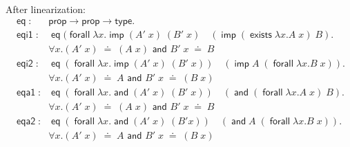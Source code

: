 \documentclass{acmconf}
\newcommand{\typeLF}{\textsf{type}}
\newcommand{\propLF}{\textsf{prop}}
\newcommand{\andLF}{\; \textsf{and}\;}
\newcommand{\impLF}{\;\textsf{imp}\;}
\newcommand{\forallLF}{\;\textsf{forall}\;}
\newcommand{\existsLF}{\;\textsf{exists}\;}
\newcommand{\eqLF}{\;\textsf{eq}\;}
\newcommand{\eqilLF}{\;\textsf{eqi1}\;}
\newcommand{\eqirLF}{\;\textsf{eqi2}\;}
\newcommand{\eqalLF}{\;\textsf{eqa1}\;}
\newcommand{\eqarLF}{\;\textsf{eqa2}\;}
\newcommand{\unif}{\;\doteq\;}
\begin{document}
After linearization:
\[
\begin{array}{ll}
\eqLF: & \propLF \rightarrow \propLF \rightarrow \typeLF.\\[1em]
%
\eqilLF: & \eqLF (\forallLF \lambda x. \impLF (A'\; x)\; (B'\;x)\quad (\impLF (\existsLF \lambda x. A\; x)\; B). \\
         & \forall x. (A'\; x) \unif (A \; x) {\textsf{ and } } B'\;x   \unif B\\[0.5em]
\eqirLF: & \eqLF (\forallLF \lambda x. \impLF (A'\;x) \; (B'\; x)) \quad (\impLF A\; (\forallLF \lambda x. B\;x)).\\
         & \forall x. (A'\; x) \unif A  {\textsf{ and }} B'\;x   \unif (B\;x)\\[0.5em]
\eqalLF: & \eqLF (\forallLF \lambda x. \andLF (A'\; x) \; (B'\;x)) \quad (\andLF (\forallLF \lambda x. A \;x) \; B).\\
         & \forall x. (A'\; x) \unif (A \; x) {\textsf{ and }} B'\;x   \unif B\\[0.5em]
\eqarLF: & \eqLF (\forallLF \lambda x. \andLF (A'\;x) \; (B' x)) \quad (\andLF A \; (\forallLF \lambda x. B\; x)).\\
         & \forall x. (A'\; x) \unif A  {\textsf{ and }} B'\;x   \unif (B\;x)\\[0.5em]
\end{array}
\]


%


\end{document}
